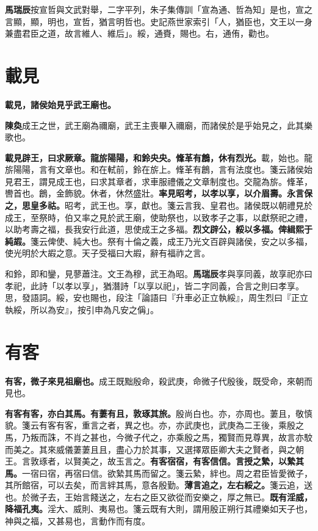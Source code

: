 \begin{quoting}\textbf{馬瑞辰}按宣哲與文武對舉，二字平列，朱子集傳訓「宣為通、哲為知」是也，宣之言顯，顯，明也，宣哲，猶言明哲也。史記燕世家索引「人，猶臣也，文王以一身兼盡君臣之道，故言維人、維后」。綏，通賚，賜也。右，通侑，勸也。\end{quoting}

\section{載見}


\textbf{載見，諸侯始見乎武王廟也。}

\begin{quoting}\textbf{陳奐}成王之世，武王廟為禰廟，武王主喪畢入禰廟，而諸侯於是乎始見之，此其樂歌也。\end{quoting}

\textbf{載見辟王，曰求厥章。龍旂陽陽，和鈴央央。鞗革有鶬，休有烈光。}{\footnotesize 載，始也。龍旂陽陽，言有文章也。和在軾前，鈴在旂上。鞗革有鶬，言有法度也。箋云諸侯始見君王，謂見成王也，曰求其章者，求車服禮儀之文章制度也。交龍為旂。鞗革，轡首也。鶬，金飾貌。休者，休然盛壯。}\textbf{率見昭考，以孝以享，以介眉壽。永言保之，思皇多祜。}{\footnotesize 昭考，武王也。享，獻也。箋云言我、皇君也。諸侯既以朝禮見於成王，至祭時，伯又率之見於武王廟，使助祭也，以致孝子之事，以獻祭祀之禮，以助考壽之福，長我安行此道，思使成王之多福。}\textbf{烈文辟公，綏以多福。俾緝熙于純嘏。}{\footnotesize 箋云俾使、純大也。祭有十倫之義，成王乃光文百辟與諸侯，安之以多福，使光明於大嘏之意。天子受福曰大嘏，辭有福祚之言。}

\begin{quoting}和鈴，即和鑾，見蓼蕭注。文王為穆，武王為昭。\textbf{馬瑞辰}孝與享同義，故享祀亦曰孝祀，此詩「以孝以享」，猶潛詩「以享以祀」，皆二字同義，合言之則曰孝享。思，發語詞。綏，安也賜也，段注「論語曰『升車必正立執綏』，周生烈曰『正立執綏，所以為安』，按引申為凡安之偁」。\end{quoting}

\section{有客}


\textbf{有客，微子來見祖廟也。}{\footnotesize 成王既黜殷命，殺武庚，命微子代殷後，既受命，來朝而見也。}

\textbf{有客有客，亦白其馬。有萋有且，敦琢其旅。}{\footnotesize 殷尚白也。亦，亦周也。萋且，敬慎貌。箋云有客有客，重言之者，異之也。亦，亦武庚也，武庚為二王後，乘殷之馬，乃叛而誅，不肖之甚也，今微子代之，亦乘殷之馬，獨賢而見尊異，故言亦駮而美之。其來威儀萋萋且且，盡心力於其事，又選擇眾臣卿大夫之賢者，與之朝王。言敦琢者，以賢美之，故玉言之。}\textbf{有客宿宿，有客信信。言授之縶，以縶其馬。}{\footnotesize 一宿曰宿，再宿曰信。欲縶其馬而留之。箋云縶，絆也。周之君臣皆愛微子，其所館宿，可以去矣，而言絆其馬，意各殷勤。}\textbf{薄言追之，左右綏之。}{\footnotesize 箋云追，送也。於微子去，王始言餞送之，左右之臣又欲從而安樂之，厚之無已。}\textbf{既有淫威，降福孔夷。}{\footnotesize 淫大、威則、夷易也。箋云既有大則，謂用殷正朔行其禮樂如天子也，神與之福，又甚易也，言動作而有度。}

